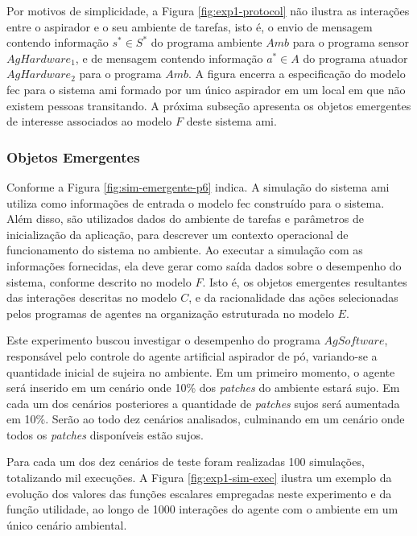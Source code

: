 Por motivos de simplicidade, a Figura \ref{fig:exp1-protocol} não ilustra as interações entre o aspirador e o seu ambiente de tarefas, isto é, o envio de mensagem contendo informação $s^* \in S^*$ do programa ambiente $Amb$ para o programa sensor $AgHardware_1$, e de mensagem contendo informação $a^* \in A$ do programa atuador $AgHardware_2$ para o programa $Amb$. A figura encerra a especificação do modelo \acrshort{fec} para o sistema \acrshort{ami} formado por um único aspirador em um local em que não existem pessoas transitando. A próxima subseção apresenta os objetos emergentes de interesse associados ao modelo $F$ deste sistema \acrshort{ami}. 

\subsubsection{Objetos Emergentes}

Conforme a Figura \ref{fig:sim-emergente-p6} indica. A simulação do sistema \acrshort{ami} utiliza como informações de entrada o modelo \acrshort{fec} construído para o sistema. Além disso, são utilizados dados do ambiente de tarefas e parâmetros de inicialização da aplicação, para descrever um contexto operacional de funcionamento do sistema no ambiente. Ao executar a simulação com as informações fornecidas, ela deve gerar como saída dados sobre o desempenho do sistema, conforme descrito no modelo $F$. Isto é, os objetos emergentes resultantes das interações descritas no modelo $C$, e da racionalidade das ações selecionadas pelos programas de agentes na organização estruturada no modelo $E$.

Este experimento buscou investigar o desempenho do programa $AgSoftware$, responsável pelo controle do agente artificial aspirador de pó, variando-se a quantidade inicial de sujeira no ambiente. Em um primeiro momento, o agente será inserido em um cenário onde 10\% dos \textit{patches} do ambiente estará sujo. Em cada um dos cenários posteriores a quantidade de \textit{patches} sujos será aumentada em 10\%. Serão ao todo dez cenários analisados, culminando em um cenário onde todos os \textit{patches} disponíveis estão sujos. 

Para cada um dos dez cenários de teste foram realizadas 100 simulações, totalizando mil execuções. A Figura \ref{fig:exp1-sim-exec} ilustra um exemplo da evolução dos valores das funções escalares empregadas neste experimento e da função utilidade, ao longo de 1000 interações do agente com o ambiente em um único cenário ambiental. 

